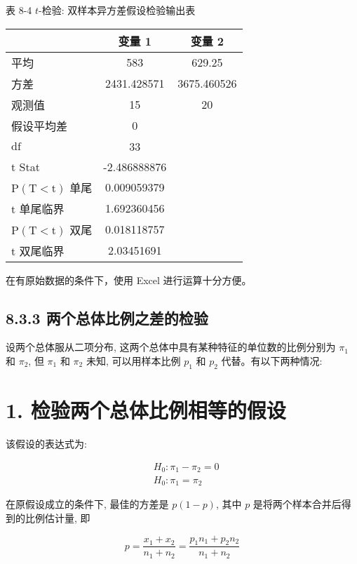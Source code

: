 \documentclass[10pt]{article}
\begin{document}
\begin{CJK*}{UTF8}{bsmi}
表 8-4 $t$-检验: 双样本异方差假设检验输出表

\begin{center}
\begin{tabular}{lcc}
\hline
 & 变量 1 & 变量 2 \\
\hline
平均 & 583 & 629.25 \\
方差 & 2431.428571 & 3675.460526 \\
观测值 & 15 & 20 \\
假设平均差 & 0 &  \\
$\mathrm{df}$ & 33 &  \\
$\mathrm{t}$ Stat & -2.486888876 &  \\
$\mathrm{P}(\mathrm{T}<\mathrm{t})$ 单尾 & 0.009059379 &  \\
$\mathrm{t}$ 单尾临界 & 1.692360456 &  \\
$\mathrm{P}(\mathrm{T}<\mathrm{t})$ 双尾 & 0.018118757 &  \\
$\mathrm{t}$ 双尾临界 & 2.03451691 &  \\
\hline
\end{tabular}
\end{center}

在有原始数据的条件下，使用 Excel 进行运算十分方便。

\subsection*{8.3.3 两个总体比例之差的检验}
设两个总体服从二项分布, 这两个总体中具有某种特征的单位数的比例分别为 $\pi_{1}$ 和 $\pi_{2}$, 但 $\pi_{1}$ 和 $\pi_{2}$ 未知, 可以用样本比例 $p_{1}$ 和 $p_{2}$ 代替。有以下两种情况:

\section*{1. 检验两个总体比例相等的假设}
该假设的表达式为:

$$
\begin{aligned}
& H_{0}: \pi_{1}-\pi_{2}=0 \\
& H_{0}: \pi_{1}=\pi_{2}
\end{aligned}
$$

在原假设成立的条件下, 最佳的方差是 $p(1-p)$, 其中 $p$ 是将两个样本合并后得到的比例估计量, 即


\begin{equation*}
p=\frac{x_{1}+x_{2}}{n_{1}+n_{2}}=\frac{p_{1} n_{1}+p_{2} n_{2}}{n_{1}+n_{2}} \tag{8.12}
\end{equation*}



\end{CJK*}
\end{document}
